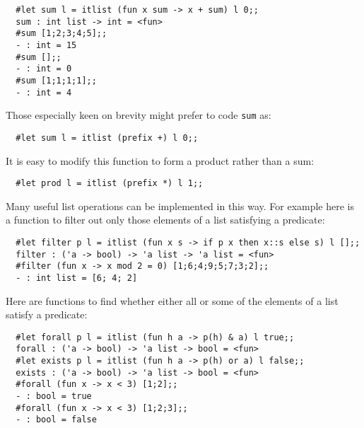 \begin{boxed}\begin{verbatim}
  #let sum l = itlist (fun x sum -> x + sum) l 0;;
  sum : int list -> int = <fun>
  #sum [1;2;3;4;5];;
  - : int = 15
  #sum [];;
  - : int = 0
  #sum [1;1;1;1];;
  - : int = 4
\end{verbatim}\end{boxed}

\noindent Those especially keen on brevity might prefer to code {\tt sum} as:

\begin{boxed}\begin{verbatim}
  #let sum l = itlist (prefix +) l 0;;
\end{verbatim}\end{boxed}

\noindent It is easy to modify this function to form a product rather than a
sum:

\begin{boxed}\begin{verbatim}
  #let prod l = itlist (prefix *) l 1;;
\end{verbatim}\end{boxed}

Many useful list operations can be implemented in this way. For example here is
a function to filter out only those elements of a list satisfying a predicate:

\begin{boxed}\begin{verbatim}
  #let filter p l = itlist (fun x s -> if p x then x::s else s) l [];;
  filter : ('a -> bool) -> 'a list -> 'a list = <fun>
  #filter (fun x -> x mod 2 = 0) [1;6;4;9;5;7;3;2];;
  - : int list = [6; 4; 2]
\end{verbatim}\end{boxed}

\noindent Here are functions to find whether either all or some of the elements
of a list satisfy a predicate:

\begin{boxed}\begin{verbatim}
  #let forall p l = itlist (fun h a -> p(h) & a) l true;;
  forall : ('a -> bool) -> 'a list -> bool = <fun>
  #let exists p l = itlist (fun h a -> p(h) or a) l false;;
  exists : ('a -> bool) -> 'a list -> bool = <fun>
  #forall (fun x -> x < 3) [1;2];;
  - : bool = true
  #forall (fun x -> x < 3) [1;2;3];;
  - : bool = false
\end{verbatim}\end{boxed}

